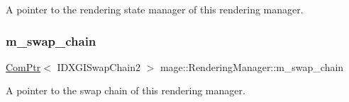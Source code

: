A pointer to the rendering state manager of this rendering manager. \hypertarget{classmage_1_1_rendering_manager_a8d07b0138d12cf720453edf32798d0cd}{}\label{classmage_1_1_rendering_manager_a8d07b0138d12cf720453edf32798d0cd} 
\subsubsection{\texorpdfstring{m\+\_\+swap\+\_\+chain}{m\_swap\_chain}}
{\footnotesize\ttfamily \hyperlink{namespacemage_ae74f374780900893caa5555d1031fd79}{Com\+Ptr}$<$ I\+D\+X\+G\+I\+Swap\+Chain2 $>$ mage\+::\+Rendering\+Manager\+::m\+\_\+swap\+\_\+chain\hspace{0.3cm}{\ttfamily [private]}}

A pointer to the swap chain of this rendering manager. 